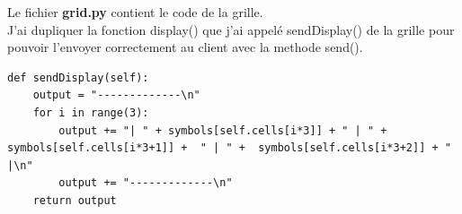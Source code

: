 \documentclass{article}
\begin{document}
Le fichier \textbf{grid.py} contient le code de la grille.\\
J'ai dupliquer la fonction display() que j'ai appelé sendDisplay() de la grille pour pouvoir l'envoyer correctement au client avec la methode send().\\
\begin{lstlisting}
def sendDisplay(self):
    output = "-------------\n"
    for i in range(3):
        output += "| " + symbols[self.cells[i*3]] + " | " + symbols[self.cells[i*3+1]] +  " | " +  symbols[self.cells[i*3+2]] + " |\n"
        output += "-------------\n"
    return output
\end{lstlisting}
\end{document}
